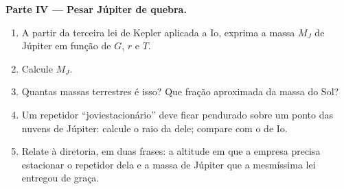 \begin{problem}
\medskip
\noindent\textbf{Parte IV --- Pesar Júpiter de quebra.}
\begin{enumerate}[resume]
  \item A partir da terceira lei de Kepler aplicada a Io, exprima a massa $M_J$ de
        Júpiter em função de $G$, $r$ e $T$.
  \item Calcule $M_J$.
  \item Quantas massas terrestres é isso? Que fração aproximada da massa do Sol?
  \item Um repetidor ``joviestacionário'' deve ficar pendurado sobre um ponto das
        nuvens de Júpiter: calcule o raio da  dele; compare com o de Io.
  \item Relate à diretoria, em duas frases: a altitude em que a empresa precisa
        estacionar o repetidor dela e a massa de Júpiter que a mesmíssima lei entregou
        de graça.
\end{enumerate}
\end{problem}
